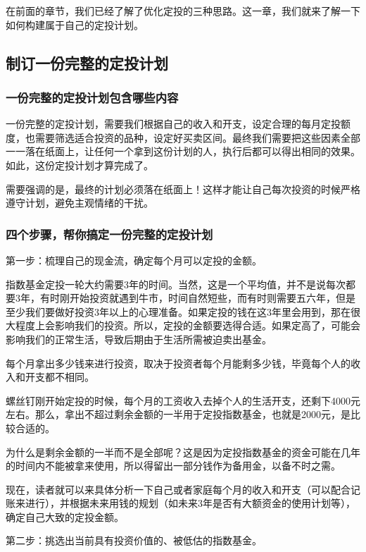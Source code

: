 
\setcounter{figure}{0}\setcounter{table}{0}
在前面的章节，我们已经了解了优化定投的三种思路。这一章，我们就来了解一下如何构建属于自己的定投计划。

\subsection{制订一份完整的定投计划}
\subsubsection{一份完整的定投计划包含哪些内容}

一份完整的定投计划，需要我们根据自己的收入和开支，设定合理的每月定投额度，也需要筛选适合投资的品种，设定好买卖区间。最终我们需要把这些因素全部一一落在纸面上，让任何一个拿到这份计划的人，执行后都可以得出相同的效果。如此，这份定投计划才算完成了。

需要强调的是，最终的计划必须落在纸面上！这样才能让自己每次投资的时候严格遵守计划，避免主观情绪的干扰。

\subsubsection{四个步骤，帮你搞定一份完整的定投计划}

第一步：梳理自己的现金流，确定每个月可以定投的金额。

指数基金定投一轮大约需要3年的时间。当然，这是一个平均值，并不是说每次都要3年，有时刚开始投资就遇到牛市，时间自然短些，而有时则需要五六年，但是至少我们要做好投资3年以上的心理准备。如果定投的钱在这3年里会用到，那在很大程度上会影响我们的投资。所以，定投的金额要选得合适。如果定高了，可能会影响我们的正常生活，导致后期由于生活所需被迫卖出基金。

每个月拿出多少钱来进行投资，取决于投资者每个月能剩多少钱，毕竟每个人的收入和开支都不相同。

螺丝钉刚开始定投的时候，每个月的工资收入去掉个人的生活开支，还剩下4000元左右。那么，拿出不超过剩余金额的一半用于定投指数基金，也就是2000元，是比较合适的。

为什么是剩余金额的一半而不是全部呢？这是因为定投指数基金的资金可能在几年的时间内不能被拿来使用，所以得留出一部分钱作为备用金，以备不时之需。

现在，读者就可以来具体分析一下自己或者家庭每个月的收入和开支（可以配合记账来进行），并根据未来用钱的规划（如未来3年是否有大额资金的使用计划等），确定自己大致的定投金额。

第二步：挑选出当前具有投资价值的、被低估的指数基金。

